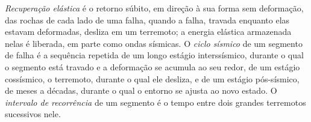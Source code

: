 \begin{definition}\label{def:b1:earthquake-source:seismic-cycle}
\emph{Recuperação elástica} é o retorno súbito, em direção à sua forma sem deformação, das rochas de cada lado de uma falha, quando a falha, travada enquanto elas estavam deformadas, desliza em um terremoto; a energia elástica armazenada nelas é liberada, em parte como ondas sísmicas. O \emph{ciclo sísmico} de um segmento de falha é a sequência repetida de um longo estágio interssísmico, durante o qual o segmento está travado e a deformação se acumula ao seu redor, de um estágio cossísmico, o terremoto, durante o qual ele desliza, e de um estágio pós-sísmico, de meses a décadas, durante o qual o entorno se ajusta ao novo estado. O \emph{intervalo de recorrência} de um segmento é o tempo entre dois grandes terremotos sucessivos nele.
\end{definition}

